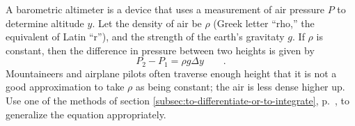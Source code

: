 A barometric altimeter is a device that uses a measurement of air pressure $P$ to determine
altitude $y$. Let the density of air be $\rho$ (Greek letter ``rho,'' the equivalent 
of Latin ``r''), and the strength of the earth's gravitaty $g$. If $\rho$ is constant, then the
difference in pressure between two heights is given by
\begin{equation*}
  P_2-P_1 = \rho g \Delta y \qquad .
\end{equation*}
Mountaineers and airplane pilots often traverse enough height that it is not
a good approximation to take $\rho$ as being constant; the air is less dense higher up.
Use one of the methods of section \ref{subsec:to-differentiate-or-to-integrate},
p.~\pageref{subsec:to-differentiate-or-to-integrate}, to generalize the equation
appropriately.
